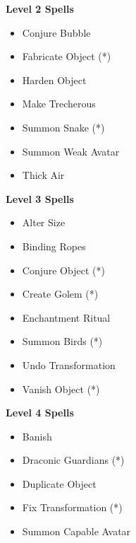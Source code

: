 \begin{multicols}{4}
{\begin{itemize}[itemsep=0em]
\end{itemize}
\textbf{Level 2 Spells}
\begin{itemize}[itemsep=0em]
\renewcommand\labelitemi{-}
\item Conjure Bubble

\item Fabricate Object (*) 

\item Harden Object

\item Make Trecherous

\item Summon Snake (*) 

\item Summon Weak Avatar

\item Thick Air


\end{itemize}
\textbf{Level 3 Spells}
\begin{itemize}[itemsep=0em]
\renewcommand\labelitemi{-}
\item Alter Size

\item Binding Ropes

\item Conjure Object (*) 

\item Create Golem (*) 

\item Enchantment Ritual

\item Summon Birds (*) 

\item Undo Transformation

\item Vanish Object (*) 


\end{itemize}
\textbf{Level 4 Spells}
\begin{itemize}[itemsep=0em]
\renewcommand\labelitemi{-}
\item Banish

\item Draconic Guardians (*) 

\item Duplicate Object

\item Fix Transformation (*) 

\item Summon Capable Avatar


\end{itemize}}
\end{multicols}
